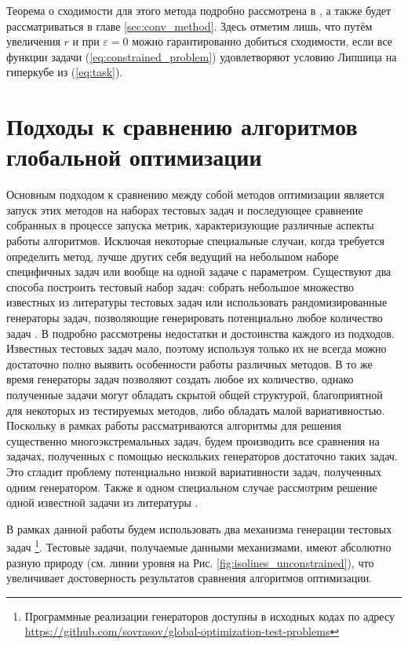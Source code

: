 Теорема о сходимости для этого метода подробно рассмотрена в \cite{Strongin2000}, а также будет рассматриваться в главе \ref{sec:conv_method}.
Здесь отметим лишь, что путём увеличения \(r\) и при \(\varepsilon=0\) можно гарантированно добиться сходимости,
если все функции задачи (\ref{eq:constrained_problem}) удовлетворяют условию Липшица на гиперкубе из (\ref{eq:task}).

\section{Подходы к сравнению алгоритмов глобальной оптимизации}
\label{sec:comp_tools}
Основным подходом к сравнению между собой методов оптимизации является запуск этих методов на наборах тестовых задач
и последующее сравнение собранных в процессе запуска метрик, характеризующие различные аспекты работы алгоритмов.
Исключая некоторые специальные случаи, когда требуется определить метод, лучше других себя ведущий на небольшом наборе специфичных задач
или вообще на одной задаче с параметром. Существуют два способа построить тестовый набор задач: собрать небольшое множество
известных из литературы тестовых задач \cite{kampfComparison2010} или использовать рандомизированные генераторы задач, позволяющие генерировать потенциально
любое количество задач \cite{Gaviano2003, grishaginClass}. В \cite{Beiranvand2017} подробно рассмотрены недостатки и достоинства каждого из
подходов. Известных тестовых задач мало, поэтому используя только их не всегда можно достаточно полно выявить особенности работы различных методов.
В то же время генераторы задач позволяют создать любое их количество, однако полученные задачи могут обладать скрытой общей структурой, благоприятной для
некоторых из тестируемых методов, либо обладать малой вариативностью. Поскольку в рамках работы рассматриваются алгоритмы
для решения существенно многоэкстремальных задач, будем производить все сравнения на задачах, полученных с помощью нескольких генераторов
достаточно таких задач. Это сгладит проблему потенциально низкой вариативности задач, полученных одним генератором. Также в одном специальном
случае рассмотрим решение одной известной задачи из литературы \cite{BinhKorn1999}.

В рамках данной работы будем использовать два механизма генерации тестовых задач \cite{grishaginClass, Gaviano2003} \footnote{Программные реализации
генераторов доступны в исходных кодах по адресу \url{https://github.com/sovrasov/global-optimization-test-problems}}. Тестовые задачи, получаемые
данными механизмами, имеют абсолютно разную природу (см. линии уровня на Рис. \ref{fig:isolines_unconstrained}),
что увеличивает достоверность результатов сравнения алгоритмов оптимизации.

